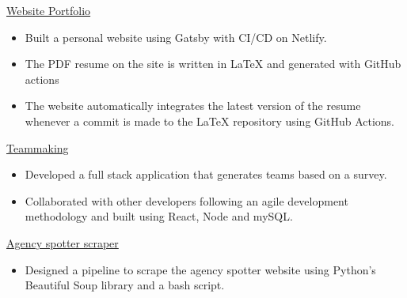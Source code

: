 
\href{https://rsun.dev}{Website Portfolio}
\begin{itemize}
    \item Built a personal website using Gatsby with CI/CD on Netlify.
    \item The PDF resume on the site is written in \LaTeX{} and generated with GitHub actions
    \item The website automatically integrates the latest version of the resume whenever a commit is made to the \LaTeX{} repository using GitHub Actions.
\end{itemize}
    
\href{https://github.com/ngrover2/teammaking}{Teammaking}
\begin{itemize}
    \item Developed a full stack application that generates teams based on a survey.
    \item Collaborated with other developers following an agile development methodology and built using React, Node and mySQL.
\end{itemize}


\href{https://github.com/rahul-sundaresan/agency-spotter-scraper}{Agency spotter scraper}
\begin{itemize}
    \item Designed a pipeline to scrape the agency spotter website using Python's Beautiful Soup library and a bash script.
\end{itemize}

